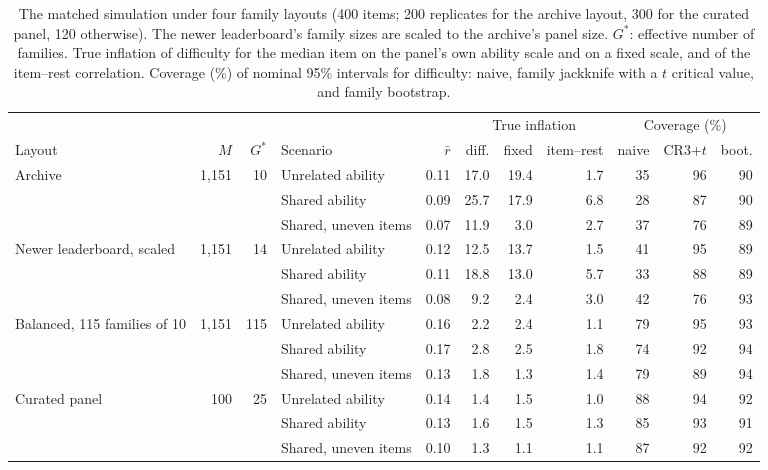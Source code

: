 \begin{table}[!htb]\centering\footnotesize\setlength{\tabcolsep}{3.5pt}
\caption{The matched simulation under four family layouts (400 items; 200 replicates for the archive layout, 300 for the curated panel, 120 otherwise). The newer leaderboard's family sizes are scaled to the archive's panel size. $G^\ast$: effective number of families. True inflation of difficulty for the median item on the panel's own ability scale and on a fixed scale, and of the item--rest correlation. Coverage (\%) of nominal 95\% intervals for difficulty: naive, family jackknife with a $t$ critical value, and family bootstrap.}\label{tab:simlayouts}
\begin{tabular}{lrrlr|rrr|rrr}
\toprule
 & & & & & \multicolumn{3}{c|}{True inflation} & \multicolumn{3}{c}{Coverage (\%)}\\
Layout & $M$ & $G^\ast$ & Scenario & $\bar r$ & diff. & fixed & item--rest & naive & CR3+$t$ & boot.\\
\midrule
Archive & 1,151 & 10 & Unrelated ability & 0.11 & 17.0 & 19.4 & 1.7 & 35 & 96 & 90\\
 & &  & Shared ability & 0.09 & 25.7 & 17.9 & 6.8 & 28 & 87 & 90\\
 & &  & Shared, uneven items & 0.07 & 11.9 & 3.0 & 2.7 & 37 & 76 & 89\\
\midrule
Newer leaderboard, scaled & 1,151 & 14 & Unrelated ability & 0.12 & 12.5 & 13.7 & 1.5 & 41 & 95 & 89\\
 & &  & Shared ability & 0.11 & 18.8 & 13.0 & 5.7 & 33 & 88 & 89\\
 & &  & Shared, uneven items & 0.08 & 9.2 & 2.4 & 3.0 & 42 & 76 & 93\\
\midrule
Balanced, 115 families of 10 & 1,151 & 115 & Unrelated ability & 0.16 & 2.2 & 2.4 & 1.1 & 79 & 95 & 93\\
 & &  & Shared ability & 0.17 & 2.8 & 2.5 & 1.8 & 74 & 92 & 94\\
 & &  & Shared, uneven items & 0.13 & 1.8 & 1.3 & 1.4 & 79 & 89 & 94\\
\midrule
Curated panel & 100 & 25 & Unrelated ability & 0.14 & 1.4 & 1.5 & 1.0 & 88 & 94 & 92\\
 & &  & Shared ability & 0.13 & 1.6 & 1.5 & 1.3 & 85 & 93 & 91\\
 & &  & Shared, uneven items & 0.10 & 1.3 & 1.1 & 1.1 & 87 & 92 & 92\\
\bottomrule
\end{tabular}
\end{table}
